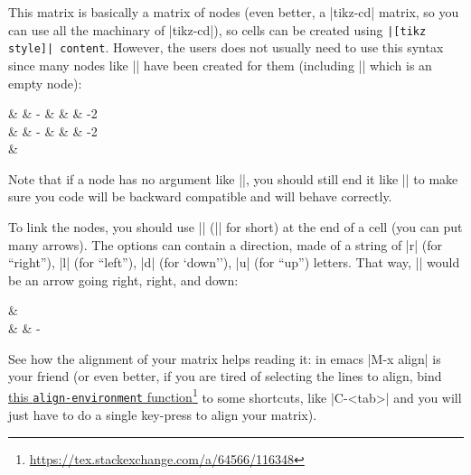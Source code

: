 \documentclass[a4paper,doc2]{ltxdoc} %
\newcommand{\mylink}[2]{\href{#1}{#2}\footnote{\url{#1}}}
\begin{document}

This matrix is basically a \tikzname{} matrix of nodes (even better, a |tikz-cd| matrix, so you can use all the machinary of |tikz-cd|), so cells can be created using \verb#|[tikz style]| content#. However, the users does not usually need to use this syntax since many nodes like || have been created for them (including |\zxN{}| which is an empty node):

\begin{codeexample}[width=0pt]
\begin{ZX}
  \zxZ{} & \zxZ{\alpha} & \zxZ-{\alpha} & \zxZ{\alpha+\beta} &  & \zxFracZ-{\pi}{2}\\
  \zxX{} & \zxX{\alpha} & \zxX-{\alpha} & \zxX{\alpha+\beta} &  & \zxFracX-{\pi}{2}\\
  \zxN{} & \zxH{}
\end{ZX}
\end{codeexample}

Note that if a node has no argument like |\zxN|, you should still end it like |\zxN{}| to make sure you code will be backward compatible and will behave correctly.

To link the nodes, you should use |\arrow[options]| (|\ar[options]| for short) at the end of a cell (you can put many arrows). The options can contain a direction, made of a string of |r| (for ``right''), |l| (for ``left''), |d| (for `down''), |u| (for ``up'') letters. That way, |\ar[rrd]| would be an arrow going right, right, and down:
\begin{codeexample}[]
\begin{ZX}
  \zxZ{} \ar[rrd] & \zxX{}\\
                  &        & \zxX-{\alpha}
\end{ZX}
\end{codeexample}
See how the alignment of your matrix helps reading it: in emacs |M-x align| is your friend (or even better, if you are tired of selecting the lines to align, bind \mylink{https://tex.stackexchange.com/a/64566/116348}{this \texttt{align-environment} function} to some shortcuts, like |C-<tab>| and you will just have to do a single key-press to align your matrix).
\end{document}
